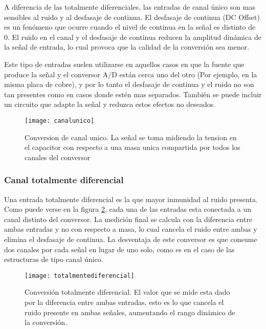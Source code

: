 A diferencia de las totalmente diferenciales, las entradas de canal único son mas sensibles al ruido y al desfasaje de continua. El desfasaje de continua (DC Offset) es un fenómeno que ocurre cuando el nivel de continua en la señal es distinto de 0. El ruido en el canal y el desfasaje de continua reducen la amplitud dinámica de la señal de entrada, lo cual provoca que la calidad de la conversión sea menor.

Este tipo de entradas suelen utilizarse en aquellos casos en que la fuente que produce la señal y el conversor A/D están cerca uno del otro (Por ejemplo, en la misma placa de cobre), y por lo tanto el desfasaje de continua y el ruido no son tan presentes como en casos donde estén mas separados. También se puede incluir un circuito que adapte la señal y reduzca estos efectos no deseados.\cite{tipos_canales}

\begin{figure}[h]
  \centering
  \texttt{[image: canalunico]}
  \caption{Conversion de canal unico. La señal se toma midiendo la tension en el capacitor con respecto a una masa unica compartida por todos los canales del conversor}\label{fig:canalunico}
\end{figure}


\subsubsection{Canal totalmente diferencial}
\label{subs:canal_totalmente_diferencial}

Una entrada totalmente diferencial es la que mayor inmunidad al ruido presenta. Como puede verse en la figura \ref{fig:totalmentediferencial}, cada una de las entradas esta conectada a un canal distinto del conversor. La medición final se calcula con la diferencia entre ambas entradas y no con respecto a masa, lo cual cancela el ruido entre ambas y elimina el desfasaje de continua. La desventaja de este conversor es que consume dos canales por cada señal en lugar de uno solo, como es en el caso de las estructuras de tipo canal único.\cite{tipos_canales}

\begin{figure}[h]
  \centering
  \texttt{[image: totalmentediferencial]}
  \caption{Conversión totalmente diferencial. El valor que se mide esta dado por la diferencia entre ambas entradas, esto es lo que cancela el ruido presente en ambas señales, aumentando el rango dinámico de la conversión.}\label{fig:totalmentediferencial}
\end{figure}

